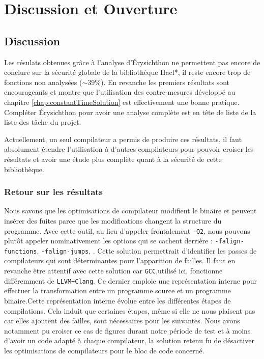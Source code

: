 \chapter*{Discussion et Ouverture}

\section*{Discussion}


Les résulats obtenues grâce à l'analyse d'Érysichthon ne permettent pas encore de conclure sur la sécurité globale de la bibliothèque Hacl*, il reste encore trop de fonctions non analysées ($\sim 39\%$). En revanche les premiers résultats sont encourageants et montre que l'utilisation des contre-mesures développé au chapitre \ref{chap:constantTimeSolution} est effectivement une bonne pratique. Compléter Érysichthon pour avoir une analyse complète est en tête de liste de la liste des tâche du projet.\medbreak

Actuellement, un seul compilateur a permis de produire ces résultats, il faut absolument étendre l'utilisation à d'autres compilateurs pour pouvoir croiser les résultats et avoir une étude plus complète quant à la sécurité de cette bibliothèque.\smallbreak

\subsection*{Retour sur les résultats}

Nous savons que les optimisations de compilateur modifient le binaire et peuvent insérer des fuites parce que les modifications changent la structure du programme. Avec cette outil, au lieu d'appeler frontalement \texttt{-O2}, nous pouvons plutôt appeler nominativement les options qui se cachent derrière : \texttt{-falign-functions}, \texttt{-falign-jumps}, \etc. Cette solution permettrait d'identifier les passes de compilateurs qui sont déterminantes pour l'apparition de failles. Il faut en revanche être attentif avec cette solution car \texttt{GCC},utilisé ici, fonctionne différemment de \texttt{LLVM+Clang}. Ce dernier emploie une représentation interne pour effectuer la transformation entre un programme source et un programme binaire.Cette représentation interne évolue entre les différentes étapes de compilations. Cela induit que certaines étapes, même si elle ne nous plaisent pas car elles ajoutent des failles, sont nécessaires pour les suivantes. Nous avons notamment pu croiser ce cas de figures durant notre période de test et à moins d'avoir un code adapté à chaque compilateur, la solution retenu fu de désactiver les optimisations de compilateurs pour le bloc de code concerné.\medbreak

